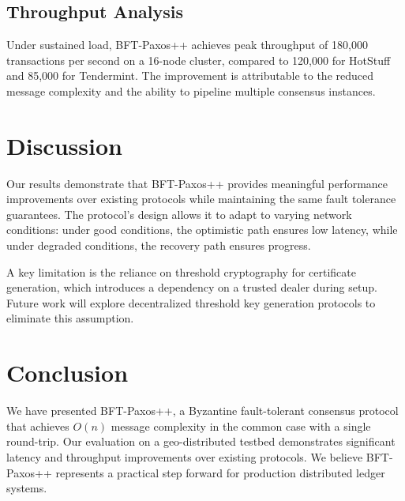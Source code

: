 \documentclass[
    language=english,
    doctype=conference-paper,
    institution=none,
]{../../omnilatex}
\begin{document}
\subsection{Throughput Analysis}

Under sustained load, BFT-Paxos++ achieves peak throughput of 180,000 transactions per second
on a 16-node cluster, compared to 120,000 for HotStuff and 85,000 for Tendermint. The
improvement is attributable to the reduced message complexity and the ability to pipeline
multiple consensus instances.

\section{Discussion}
\label{sec:discussion}

Our results demonstrate that BFT-Paxos++ provides meaningful performance improvements over
existing protocols while maintaining the same fault tolerance guarantees. The protocol's
design allows it to adapt to varying network conditions: under good conditions, the optimistic
path ensures low latency, while under degraded conditions, the recovery path ensures
progress.

A key limitation is the reliance on threshold cryptography for certificate generation,
which introduces a dependency on a trusted dealer during setup. Future work will explore
decentralized threshold key generation protocols to eliminate this assumption.

\section{Conclusion}
\label{sec:conclusion}

We have presented BFT-Paxos++, a Byzantine fault-tolerant consensus protocol that achieves
$O(n)$ message complexity in the common case with a single round-trip. Our evaluation on
a geo-distributed testbed demonstrates significant latency and throughput improvements over
existing protocols. We believe BFT-Paxos++ represents a practical step forward for
production distributed ledger systems.



\end{document}
